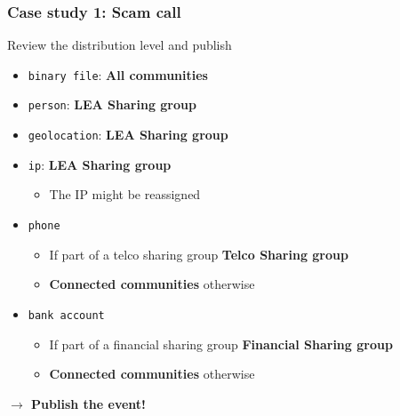 \begin{frame}
    \frametitle{Case study 1: Scam call}
    Review the distribution level and publish
    \begin{itemize}
        \item \texttt{binary file}: \textbf{All communities}
        \item \texttt{person}: \textbf{LEA Sharing group}
        \item \texttt{geolocation}: \textbf{LEA Sharing group}
        \item \texttt{ip}: \textbf{LEA Sharing group}
        \begin{itemize}
            \item The IP might be reassigned
        \end{itemize}
        \item \texttt{phone}
        \begin{itemize}
            \item If part of a telco sharing group \textbf{Telco Sharing group}
            \item \textbf{Connected communities} otherwise
        \end{itemize}
        \item \texttt{bank account}
        \begin{itemize}
            \item If part of a financial sharing group \textbf{Financial Sharing group}
            \item \textbf{Connected communities} otherwise
        \end{itemize}
    \end{itemize}
    \begin{center}
        \textbf{$\rightarrow$ Publish the event!}
    \end{center}
\end{frame}


%
%
%
%

